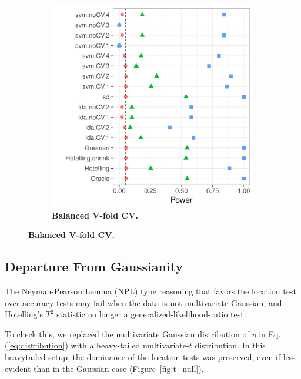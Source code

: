 \documentclass[12pt,a4paper]{article}
\begin{document}
\begin{figure}[h]
\begin{subfigure}{.5\textwidth}
		\includegraphics[width=1\linewidth]{"art/file2"}
		\caption{\textbf{Balanced V-fold CV.}} 
		\label{fig:simulation_12}
	\end{subfigure}
\end{figure}






\subsection{Departure From Gaussianity}
The Neyman-Pearson Lemma (NPL) type reasoning that favors the location test over accuracy tests may fail when the data is not multivariate Gaussian, and Hotelling's $T^2$ statistic no longer a generalized-likelihood-ratio test. 

To check this, we replaced the multivariate Gaussian distribution of $\eta$ in Eq.(\ref{eq:distribution}) with a heavy-tailed multivariate-$t$ distribution. 
In this heavytailed setup, the dominance of the location tests was preserved, even if less evident than in the Gaussian case (Figure~\ref{fig:t_null}).
\end{document}
